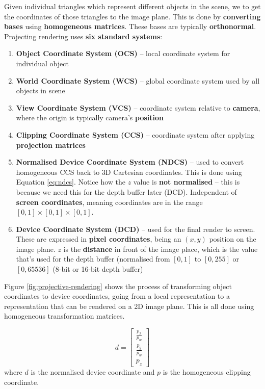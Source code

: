\documentclass{article}
\begin{document}
Given individual triangles which represent different objects in the scene, we to get the coordinates of those triangles to the image plane. This is done by \textbf{converting bases} using \textbf{homogeneous matrices}. These bases are typically \textbf{orthonormal}. Projecting rendering uses \textbf{six standard systems}:
\begin{enumerate}
	\item \textbf{Object Coordinate System (OCS)} -- local coordinate system for individual object
	\item \textbf{World Coordinate System (WCS)} -- global coordinate system used by all objects in scene
	\item \textbf{View Coordinate System (VCS)} -- coordinate system relative to \textbf{camera}, where the origin is typically camera's \textbf{position}
	\item \textbf{Clipping Coordinate System (CCS)} -- coordinate system after applying \textbf{projection matrices}
	\item \textbf{Normalised Device Coordinate System (NDCS)} -- used to convert homogeneous CCS back to 3D Cartesian coordinates. This is done using Equation \ref{eq:ndcs}. Notice how the $z$ value is \textbf{not normalised} -- this is because we need this for the depth buffer later (DCD). Independent of \textbf{screen coordinates}, meaning coordinates are in the range $[0,1] \times [0,1] \times [0,1]$.
	\item \textbf{Device Coordinate System (DCD)} -- used for the final render to screen. These are expressed in \textbf{pixel coordinates}, being an $(x, y)$ position on the image plane. $z$ is the \textbf{distance} in front of the image place, which is the value that's used for the depth buffer (normalised from $[0,1]$ to $[0,255]$ or $[0,65536]$ (8-bit or 16-bit depth buffer)
\end{enumerate}
Figure \ref{fig:projective-rendering} shows the process of transforming object coordinates to device coordinates, going from a local representation to a representation that can be rendered on a 2D image plane. This is all done using homogeneous transformation matrices.

\begin{equation}
	d = \left[ \begin{matrix}
		\frac{p_x}{p_w}	\\ \frac{p_y}{p_w} \\ p_z
	\end{matrix} \right]
	\label{eq:ndcs}
\end{equation}
where $d$ is the normalised device coordinate and $p$ is the homogeneous clipping coordinate.
\end{document}
